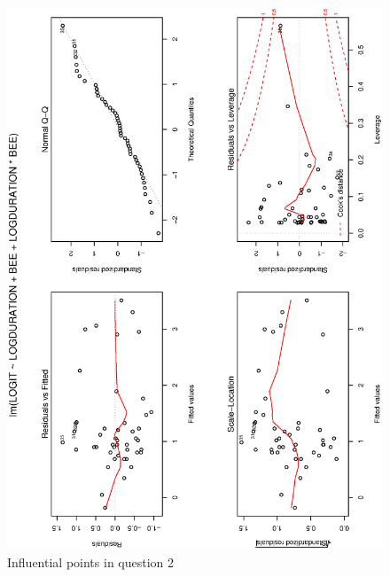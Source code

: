 \documentclass[a4paper,10pt]{article}
\begin{document}
\begin{figure}
\includegraphics[angle=-90, width=1\textwidth]{figures/math650_hw7_fig5.eps}
\caption{Influential points in question 2}\label{f5}
\end{figure}
\end{document}
